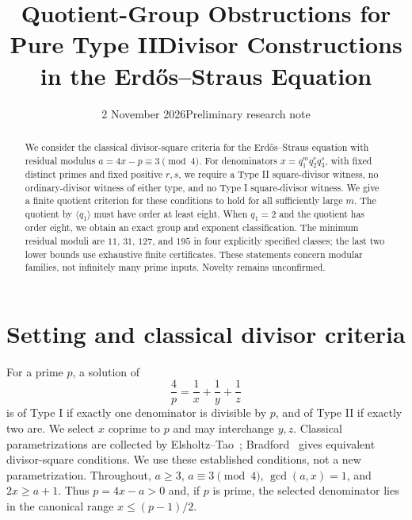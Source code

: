 \documentclass[11pt,a4paper]{article}
\title{Quotient-Group Obstructions for Pure Type II\newline Divisor Constructions in the Erd\H{o}s--Straus Equation}
\author{}
\date{2 November 2026\quad\small Preliminary research note}
\theoremstyle{definition}\newtheorem{definition}[theorem]{Definition}
\begin{document}
\maketitle
\vspace{-1.4em}
\begin{abstract}
We consider the classical divisor-square criteria for the Erd\H{o}s--Straus equation with residual modulus $a=4x-p\equiv3\pmod4$. For denominators $x=q_1^m q_2^r q_3^s$, with fixed distinct primes and fixed positive $r,s$, we require a Type II square-divisor witness, no ordinary-divisor witness of either type, and no Type I square-divisor witness. We give a finite quotient criterion for these conditions to hold for all sufficiently large $m$. The quotient by $\langle q_1\rangle$ must have order at least eight. When $q_1=2$ and the quotient has order eight, we obtain an exact group and exponent classification. The minimum residual moduli are $11$, $31$, $127$, and $195$ in four explicitly specified classes; the last two lower bounds use exhaustive finite certificates. These statements concern modular families, not infinitely many prime inputs. Novelty remains unconfirmed.
\end{abstract}

\section{Setting and classical divisor criteria}
For a prime $p$, a solution of
\begin{equation}\label{es}
\frac4p=\frac1x+\frac1y+\frac1z
\end{equation}
is of Type I if exactly one denominator is divisible by $p$, and of Type II if exactly two are. We select $x$ coprime to $p$ and may interchange $y,z$. Classical parametrizations are collected by Elsholtz--Tao~\cite[\S2]{ET}; Bradford~\cite[Propositions 1--4]{Bradford} gives equivalent divisor-square conditions. We use these established conditions, not a new parametrization. Throughout, $a\ge3$, $a\equiv3\pmod4$, $\gcd(a,x)=1$, and $2x\ge a+1$. Thus $p=4x-a>0$ and, if $p$ is prime, the selected denominator lies in the canonical range $x\le(p-1)/2$.
\end{document}
